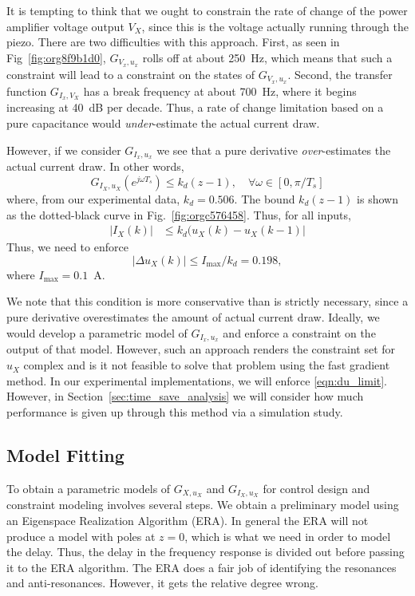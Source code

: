 \documentclass[journal,twocolumn,twoside]{IEEEtran/IEEEtran}
\begin{document}
It is tempting to think that we ought to constrain the rate of change of the power amplifier voltage output $V_X$, since this is the voltage actually running through the piezo. There are two difficulties with this approach. First, as seen in Fig~\ref{fig:org8f9b1d0}, \(G_{V_{x},u_{x}}\) rolls off at about 250~Hz, which means that such a constraint will lead to a constraint on the states of \(G_{V_{x},u_{x}}\). Second, the transfer function \(G_{I_{x}, V_{X}}\) has a break frequency at about 700~Hz, where it begins increasing at 40~dB per decade. Thus, a rate of change limitation based on a pure capacitance would \emph{under}-estimate the actual current draw.

However, if we consider \(G_{I_{x},u_{x}}\) we see that a pure derivative \emph{over}-estimates the actual current draw. 
In other words, 
\begin{equation}
G_{I_{X},u_{X}}(e^{j\omega T_{s}}) \leq k_d(z-1), \quad \forall \omega \in[0, \pi/T_s]
\end{equation}
where, from our experimental data, $k_d=0.506$. The bound $k_d(z-1)$ is shown as the dotted-black curve in Fig.~\ref{fig:orgc576458}. Thus, for all inputs,
\begin{align}
|I_{X}(k)| &\leq k_d(u_X(k) - u_X(k-1)|
\end{align}
Thus, we need to enforce
\begin{equation}
|\Delta u_X(k)| \leq I_{\text{max}}/k_d = 0.198, \label{eqn:du_limit}
\end{equation}
where $I_{\text{max}} = 0.1$~A.

We note that this condition is more conservative than is strictly necessary, since a pure derivative overestimates the amount of actual current draw. Ideally, we would develop a parametric model of \(G_{I_{x},u_{x}}\) and enforce a constraint on the output of that model. However, such an approach renders the constraint set for $u_X$ complex and is it not feasible to solve that problem using the fast gradient method. In our experimental implementations, we will enforce \eqref{eqn:du_limit}. However, in Section~\ref{sec:time_save_analysis} we will consider how much performance is given up through this method via a simulation study. 


\subsection{Model Fitting}
To obtain a parametric models of $G_{X,u_X}$ and $G_{I_X, u_X}$ for control design and constraint modeling involves several steps. We obtain a preliminary model using an Eigenspace Realization Algorithm (ERA). In general the ERA will not produce a model with poles at $z=0$, which is what we need in order to model the delay. Thus, the delay in the frequency response is divided out before passing it to the ERA algorithm. The ERA does a fair job of identifying the resonances and anti-resonances. However, it gets the relative degree wrong.
\end{document}
